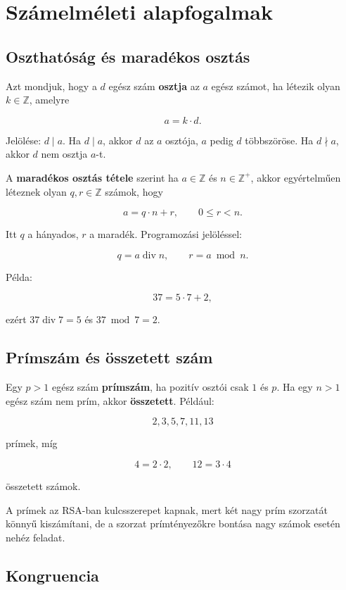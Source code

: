 \section{Számelméleti alapfogalmak}

\subsection{Oszthatóság és maradékos osztás}

Azt mondjuk, hogy a $d$ egész szám \textbf{osztja} az $a$ egész számot, ha létezik olyan $k\in\mathbb{Z}$, amelyre

\[
a=k\cdot d.
\]

Jelölése: $d\mid a$. Ha $d\mid a$, akkor $d$ az $a$ osztója, $a$ pedig $d$ többszöröse. Ha $d\nmid a$, akkor $d$ nem osztja $a$-t.

A \textbf{maradékos osztás tétele} szerint ha $a\in\mathbb{Z}$ és $n\in\mathbb{Z}^{+}$, akkor egyértelműen léteznek olyan $q,r\in\mathbb{Z}$ számok, hogy

\[
a=q\cdot n+r,\qquad 0\leq r<n.
\]

Itt $q$ a hányados, $r$ a maradék. Programozási jelöléssel:

\[
q=a\operatorname{ div }n,\qquad r=a\bmod n.
\]

Példa:

\[
37=5\cdot 7+2,
\]

ezért $37\operatorname{ div }7=5$ és $37\bmod7=2$.

\subsection{Prímszám és összetett szám}

Egy $p>1$ egész szám \textbf{prímszám}, ha pozitív osztói csak $1$ és $p$. Ha egy $n>1$ egész szám nem prím, akkor \textbf{összetett}. Például:

\[
2,3,5,7,11,13
\]

prímek, míg

\[
4=2\cdot2,\qquad 12=3\cdot4
\]

összetett számok.

A prímek az RSA-ban kulcsszerepet kapnak, mert két nagy prím szorzatát könnyű kiszámítani, de a szorzat prímtényezőkre bontása nagy számok esetén nehéz feladat.

\subsection{Kongruencia}


